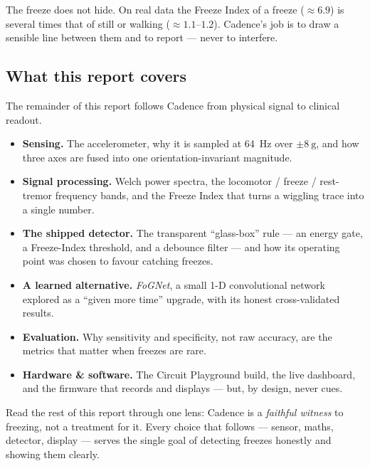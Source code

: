 \begin{keyidea}
The freeze does not hide. On real data the Freeze Index of a freeze ($\approx 6.9$) is
several times that of still or walking ($\approx 1.1$--$1.2$). Cadence's job is to draw a
sensible line between them and to report --- never to interfere.
\end{keyidea}

\subsection{What this report covers}

The remainder of this report follows Cadence from physical signal to clinical readout.

\begin{itemize}
\item \textbf{Sensing.} The accelerometer, why it is sampled at \SI{64}{\hertz} over
$\pm\SI{8}{\g}$, and how three axes are fused into one orientation-invariant magnitude.
\item \textbf{Signal processing.} Welch power spectra, the locomotor / freeze /
rest-tremor frequency bands, and the Freeze Index that turns a wiggling trace into a
single number.
\item \textbf{The shipped detector.} The transparent ``glass-box'' rule --- an energy
gate, a Freeze-Index threshold, and a debounce filter --- and how its operating point was
chosen to favour catching freezes.
\item \textbf{A learned alternative.} \emph{FoGNet}, a small 1-D convolutional network
explored as a ``given more time'' upgrade, with its honest cross-validated results.
\item \textbf{Evaluation.} Why sensitivity and specificity, not raw accuracy, are the
metrics that matter when freezes are rare.
\item \textbf{Hardware \& software.} The Circuit Playground build, the live dashboard,
and the firmware that records and displays --- but, by design, never cues.
\end{itemize}

\begin{takeaway}
Read the rest of this report through one lens: Cadence is a \emph{faithful witness} to
freezing, not a treatment for it. Every choice that follows --- sensor, maths, detector,
display --- serves the single goal of detecting freezes honestly and showing them
clearly.
\end{takeaway}
